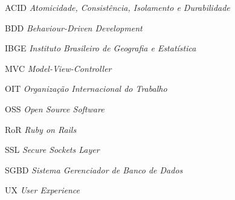 \begin{siglas}
\item[ACID] \textit{Atomicidade, Consistência, Isolamento e Durabilidade}
\item[BDD] \textit{Behaviour-Driven Development}
\item[IBGE] \textit{Instituto Brasileiro de Geografia e Estatística}
\item[MVC] \textit{Model-View-Controller}
\item[OIT] \textit{Organização Internacional do Trabalho}
\item[OSS] \textit{Open Source Software}
\item[RoR] \textit{Ruby on Rails}
\item[SSL] \textit{Secure Sockets Layer}
\item[SGBD] \textit{Sistema Gerenciador de Banco de Dados}
\item[UX] \textit{User Experience}
\end{siglas}





